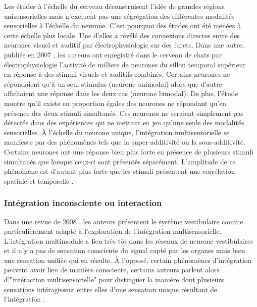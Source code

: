 Les études à l'échelle du cerveau déconstruisent l'idée de grandes régions unisensorielles mais n'excluent pas une ségrégation des différentes modalités sensorielles à l'échelle du neurone. C'est pourquoi des études ont été menées à cette échelle plus locale. Une d'elles a révélé des connexions directes entre des neurones visuel et auditif \cite{bizley_physiological_2007} par électrophysiologie sur des furets. Dans une autre, publiée en 2007 \cite{allman_multisensory_2007}, les auteurs ont enregistré dans le cerveau de chats par électrophysiologie l'activité de milliers de neurones du sillon temporal supérieur en réponse à des stimuli visuels et auditifs combinés. Certains neurones ne répondaient qu'à un seul stimulus (neurone unimodal) alors que d'autre affichaient une réponse dans les deux cas (neurone bimodal). De plus, l'étude montre qu'il existe en proportion égales des neurones ne répondant qu'en présence des deux stimuli simultanés. Ces neurones ne seraient simplement pas détectés dans des expériences qui ne mettant en jeu qu'une seule des modalités sensorielles. À l'échelle du neurone unique, l'intégration multisensorielle se manifeste par des phénomènes tels que la super-additivité ou la sous-additivité. Certains neurones ont une réponse bien plus forte en présence de plusieurs stimuli simultanés que lorsque ceux-ci sont présentés séparément. L'amplitude de ce phénomène est d'autant plus forte que les stimuli présentent une corrélation spatiale et temporelle \cite{stein_multisensory_2008}. 


\subsubsection{Intégration inconsciente ou interaction}

Dans une revue de 2008 \cite{angelaki_vestibular_2008}, les auteurs présentent le système vestibulaire comme particulièrement adapté à l'exploration de l'intégration multisensorielle. L'intégration multimodale a lieu très tôt dans les réseaux de neurone vestibulaires et il n'y a pas de sensation consciente du signal capté par les organes mais bien une sensation unifiée qui en résulte.
À l'opposé, certain phénomènes d'intégration peuvent avoir lieu de manière consciente, certains auteurs parlent alors d'"intéraction multisensorielle" pour distinguer la manière dont plusieurs sensations intéragissent entre elles d'une sensation unique résultant de l'intégration \cite{driver_multisensory_2008}. 

